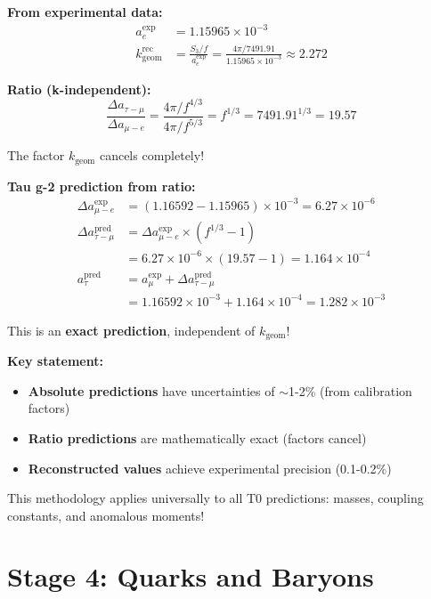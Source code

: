 	\textbf{From experimental data:}
	\begin{align}
		a_e^{\exp} &= 1.15965 \times 10^{-3} \\
		k_{\text{geom}}^{\text{rec}} &= \frac{S_3/f}{a_e^{\exp}} = \frac{4\pi/7491.91}{1.15965 \times 10^{-3}} \approx 2.272
	\end{align}
	
	\textbf{Ratio (k-independent):}
	\begin{equation}
		\boxed{\frac{\Delta a_{\tau-\mu}}{\Delta a_{\mu-e}} = \frac{4\pi/f^{4/3}}{4\pi/f^{5/3}} = f^{1/3} = 7491.91^{1/3} = 19.57}
	\end{equation}
	
	The factor \(k_{\text{geom}}\) cancels completely!
	
	\textbf{Tau g-2 prediction from ratio:}
	\begin{align}
		\Delta a_{\mu-e}^{\exp} &= (1.16592 - 1.15965) \times 10^{-3} = 6.27 \times 10^{-6} \\
		\Delta a_{\tau-\mu}^{\text{pred}} &= \Delta a_{\mu-e}^{\exp} \times (f^{1/3} - 1) \\
		&= 6.27 \times 10^{-6} \times (19.57 - 1) = 1.164 \times 10^{-4} \\
		a_\tau^{\text{pred}} &= a_\mu^{\exp} + \Delta a_{\tau-\mu}^{\text{pred}} \\
		&= 1.16592 \times 10^{-3} + 1.164 \times 10^{-4} = 1.282 \times 10^{-3}
	\end{align}
	
	This is an \textbf{exact prediction}, independent of \(k_{\text{geom}}\)!
	
	\textbf{Key statement:}
	
	\begin{itemize}
		\item \textbf{Absolute predictions} have uncertainties of \(\sim\)1-2\% (from calibration factors)
		\item \textbf{Ratio predictions} are mathematically exact (factors cancel)
		\item \textbf{Reconstructed values} achieve experimental precision (0.1-0.2\%)
	\end{itemize}
	
	This methodology applies universally to all T0 predictions: masses, coupling constants, and anomalous moments!
	
	\section{Stage 4: Quarks and Baryons}
	
